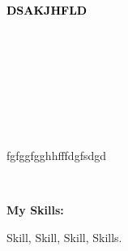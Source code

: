 \documentclass[9pt]{developercv} %
\begin{document}
    
    \begin{minipage}[t]{0.5\textwidth} 
    \vspace{-\baselineskip}
    
    \fontsize{16}{20} \textcolor{black}{\textbf{\MakeUppercase{dsakjhfld}}}
    
    \vspace{6pt}
    
    
    \end{minipage}
    \hfill
    \begin{minipage}[t]{0.2\textwidth}
      \vspace{-\baselineskip}
      
      \\
      \\
      \
      
    \end{minipage}
    \begin{minipage}[t]{0.27\textwidth}
      \vspace{-\baselineskip}
      
      \\
      \\
      \    
        
    \end{minipage}
    
    \begin{minipage}[t]{0.46\textwidth}
    \vspace{-6pt}

    fgfggfgghhfffdgfsdgd\\
    \end{minipage}
    \hfill
    \
    \begin{minipage}[t]{0.465\textwidth}
    \vspace{-6pt}
    
    
        \begin{minipage}[t]{0.2\textwidth}
        \textbf{My Skills:}
        \end{minipage}
        \hfill
        \begin{minipage}[t]{0.73\textwidth}
          Skill, Skill, Skill, Skills.
        \end{minipage}
        
    
    
    
\end{minipage}
    
\end{document}
